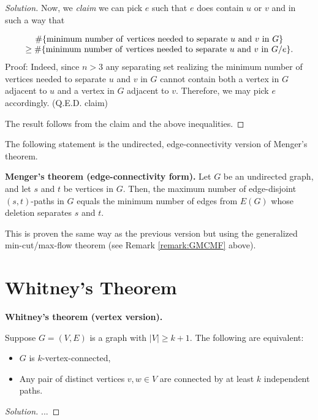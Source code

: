 \begin{proof}[Solution]
Now, we {\it claim} we can pick $e$ such that $e$ does contain $u$ or $v$
and in such a way that

\[
\begin{array}{c}
\# \{{\rm minimum\ number \ of\ vertices\ needed\ to\ separate\ }u\
{\rm and\  }v\ {\rm in\ }G\}\\
\geq
\# \{{\rm minimum\ number \ of\ vertices\ needed\ to\ separate\ }u\ 
{\rm and\  }v\ {\rm in}\ G/e\}.
\end{array}
\]
Proof: Indeed, since $n>3$ any separating set realizing
the minimum number  of vertices needed to separate $u$ and 
$v$ in $G$ cannot contain both a vertex in $G$ adjacent to $u$ and a vertex in
$G$ adjacent to $v$. Therefore, we may pick $e$ accordingly.
(Q.E.D. claim)

The result follows from the claim and the above inequalities.
\end{proof}

The following statement 
is the undirected, edge-connectivity version of
Menger's theorem.

\begin{theorem}
\textbf{Menger's theorem (edge-connectivity form).}
{\rm
Let $G$ be an undirected graph, and let $s$ and $t$ be vertices in
$G$. 
Then, the maximum number of edge-disjoint $(s,t)$-paths in
$G$ 
equals the minimum number of edges from $E(G)$ whose
deletion separates $s$ and $t$.
}
\end{theorem}

This is proven the same way as the previous version
but using the generalized min-cut/max-flow theorem (see 
Remark \ref{remark:GMCMF} above).


\section{Whitney's Theorem}

\begin{theorem} 
\textbf{Whitney's theorem (vertex version).}
{\rm
Suppose $G=(V,E)$ is a graph with $|V|\geq k+1$. The following are
equivalent:
\begin{itemize}
\item
$G$ is $k$-vertex-connected,
\item
Any pair of distinct vertices $v,w\in V$ are connected by
at least $k$ independent paths.
\end{itemize}
}
\end{theorem}

\begin{proof}[Solution]

...

\end{proof}



